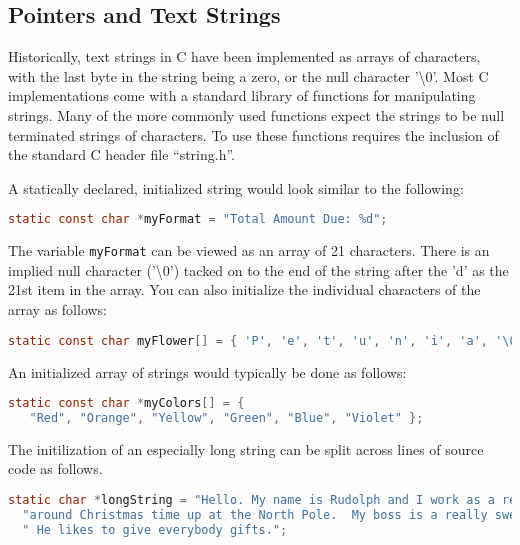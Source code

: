 \subsection{Pointers and Text Strings}
Historically, text strings in C have been implemented as arrays of characters,
with the last byte in the string being a zero, or the null character
'\textbackslash{}0'. Most C implementations come with a standard library of
functions for manipulating strings. Many of the more commonly used functions
expect the strings to be null terminated strings of characters.  To use these
functions requires the inclusion of the standard C header file ``string.h''. 

A statically declared, initialized string would look similar to the following:
\lstset{basicstyle=\scriptsize, numbers=left, captionpos=b, tabsize=4}
\begin{lstlisting}[caption=Section \thesection listing \arabic{pntcnt},language={C},
breaklines=true,xleftmargin=15pt,label=lst:section\thesection listing\arabic{pntcnt}]
static const char *myFormat = "Total Amount Due: %d";
\end{lstlisting}

The variable \texttt{myFormat} can be viewed as an array of 21 characters.
There is an implied null character ('\textbackslash{}0') tacked on to the end
of the string after the 'd' as the 21st item in the array.  You can also
initialize the individual characters of the array as follows:
\lstset{basicstyle=\scriptsize, numbers=left, captionpos=b, tabsize=4}
\begin{lstlisting}[caption=Section \thesection listing \arabic{pntcnt},language={C},
breaklines=true,xleftmargin=15pt,label=lst:section\thesection listing\arabic{pntcnt}]
static const char myFlower[] = { 'P', 'e', 't', 'u', 'n', 'i', 'a', '\0' };
\end{lstlisting}

An initialized array of strings would typically be done as follows:
\lstset{basicstyle=\scriptsize, numbers=left, captionpos=b, tabsize=4}
\begin{lstlisting}[caption=Section \thesection listing \arabic{pntcnt},language={C},
breaklines=true,xleftmargin=15pt,label=lst:section\thesection listing\arabic{pntcnt}]
static const char *myColors[] = {
   "Red", "Orange", "Yellow", "Green", "Blue", "Violet" };
\end{lstlisting}

The initilization of an especially long string can be split across lines of
source code as follows.
\lstset{basicstyle=\scriptsize, numbers=left, captionpos=b, tabsize=4}
\begin{lstlisting}[caption=Section \thesection listing \arabic{pntcnt},language={C},
breaklines=true,xleftmargin=15pt,label=lst:section\thesection listing\arabic{pntcnt}]
static char *longString = "Hello. My name is Rudolph and I work as a reindeer "
  "around Christmas time up at the North Pole.  My boss is a really swell guy."
  " He likes to give everybody gifts.";
\end{lstlisting}

